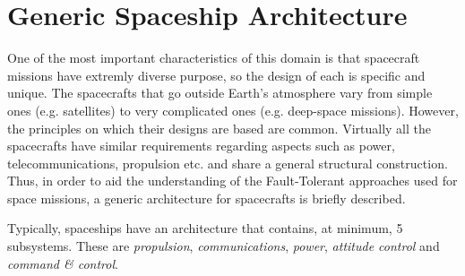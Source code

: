 \section{Generic Spaceship Architecture}
One of the most important characteristics of this domain is that spacecraft
missions have extremly diverse purpose, so the design of each is specific and
unique. The spacecrafts that go outside Earth's atmosphere vary from simple ones
(e.g. satellites) to very complicated ones (e.g. deep-space missions). However,
the principles on which their designs are based are common. Virtually all the
spacecrafts have similar requirements regarding aspects such as power,
telecommunications, propulsion etc. and share a general structural construction.
Thus, in order to aid the understanding of the Fault-Tolerant approaches used
for space missions, a generic architecture for spacecrafts is briefly described.

Typically, spaceships have an architecture that contains, at minimum, 5
subsystems\cite{ft-space-avionics}. These are \textit{propulsion},
\textit{communications}, \textit{power}, \textit{attitude control} and
\textit{command \& control}.

